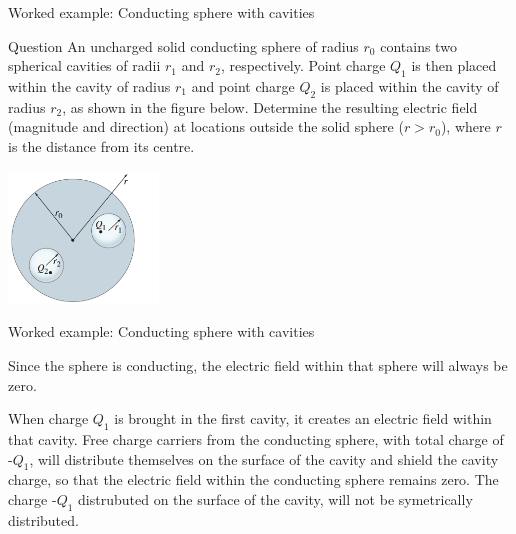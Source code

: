 {
\problemslide

%
%
%

\begin{frame}{Worked example: Conducting sphere with cavities}

  \begin{blockexmplque}{Question}
    An uncharged solid conducting sphere of radius $r_0$
    contains two spherical cavities of radii $r_1$ and $r_2$, respectively.
    Point charge $Q_1$ is then placed within the cavity of radius $r_1$
    and point charge $Q_2$ is placed within the cavity of radius $r_2$,
    as shown in the figure below. Determine the resulting electric field
    (magnitude and direction) at locations outside the solid sphere
    ($r>r_0$), where $r$ is the distance from its centre.
    \begin{center}
      \includegraphics[width=0.30\textwidth]{./images/problems/lect04_sphere_with_2_cavities}\\
    \end{center}
  \end{blockexmplque}

\end{frame}

%
%
%

\begin{frame}{Worked example: Conducting sphere with cavities}

  Since the sphere is conducting, the electric field within that sphere
  will always be zero.\\
  \vspace{0.2cm}

  When charge $Q_1$ is brought in the first cavity, it creates an
  electric field within that cavity. Free charge carriers from the conducting
  sphere, with total charge of -$Q_1$, will distribute themselves on the
  surface of the cavity and shield the cavity charge, so that the electric field
  within the conducting sphere remains zero. The charge -$Q_1$ distrubuted
  on the surface of the cavity, will not be symetrically distributed.\\
  \vspace{0.2cm}


\end{frame}}
